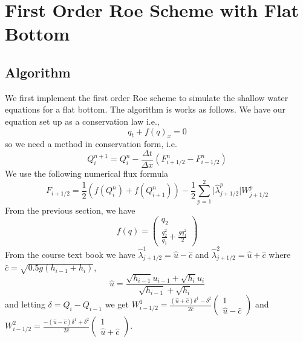 \section{First Order Roe Scheme with Flat Bottom}
\subsection{Algorithm}
We first implement the first order Roe scheme to simulate the shallow water equations for a flat bottom. The algorithm is works as follows. We have our equation set up as a conservation law i.e.,
$$q_t+f(q)_x=0$$
so we need a method in conservation form, i.e.
$$Q_i^{n+1} = Q_i^n - \frac{\Delta t}{\Delta x}(F^n_{i+1/2}-F^n_{i-1/2})$$ 
We use the following numerical flux formula
$$F_{i+1/2}=\frac{1}{2}(f(Q_i^n)+f(Q_{i+1}^n))-\frac{1}{2}\sum_{p=1}^2 \lvert \hat{\lambda}_{j+1/2}^p \rvert W_{j+1/2}^p$$
From the previous section, we have 
$$f(q) = \begin{pmatrix}
q_2\\ \frac{q_2^2}{q_1} + \frac{gq_1^2}{2}
\end{pmatrix}$$
From the course text book we have $\hat{\lambda}^1_{j+1/2} = \hat{u}-\hat{c}$ and $\hat{\lambda}^2_{j+1/2} = \hat{u}+\hat{c}$ where $\hat{c}=\sqrt{0.5g(h_{i-1}+h_i)}$,
$$\hat{u}=\frac{\sqrt{h_{i-1}}u_{i-1}+\sqrt{h_i}u_i}{\sqrt{h_{i-1}}+\sqrt{h_i}}$$ 
and letting $\delta = Q_i - Q_{i-1}$ we get $W^1_{i-1/2}=\frac{(\hat{u}+\hat{c})\delta^1 - \delta^2}{2\hat{c}}\begin{pmatrix}
1\\ \hat{u} - \hat{c}
\end{pmatrix}$ and $W^2_{i-1/2}=\frac{-(\hat{u}-\hat{c})\delta^1 + \delta^2}{2\hat{c}}\begin{pmatrix}
1\\ \hat{u} + \hat{c}
\end{pmatrix}$.
